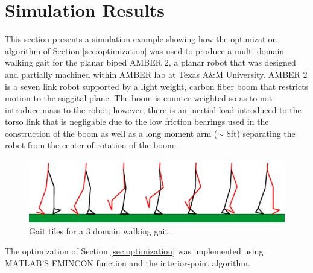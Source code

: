 \section{Simulation Results}
\label{sec:simresults}

This section presents a simulation example showing how the optimization algorithm of Section \ref{sec:optimization} was used to produce a multi-domain walking gait for the planar biped AMBER 2, a planar robot that was designed and partially machined within AMBER lab at Texas A\&M University. AMBER 2 is a seven link robot supported by a light weight, carbon fiber boom that restricts motion to the saggital plane. The boom is counter weighted so as to not introduce mass to the robot; however, there is an inertial load introduced to the torso link that is negligable due to the low friction bearings used in the construction of the boom as well as a long moment arm ($\sim$ 8ft) separating the robot from the center of rotation of the boom.
\begin{figure}
\centering
\includegraphics[scale=0.26]{figures/Tiles.pdf}
\caption{Gait tiles for a 3 domain walking gait.}
\label{fig:Tiles}
\end{figure} 
The optimization of Section \ref{sec:optimization} was implemented using MATLAB'S FMINCON function and the interior-point algorithm.
